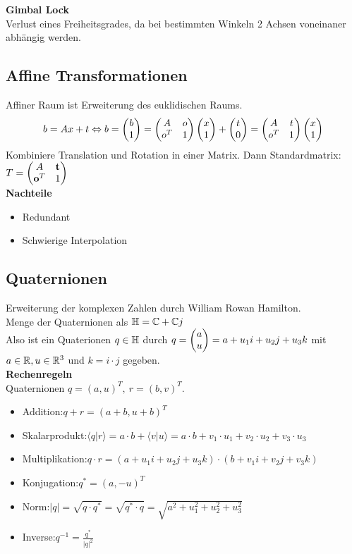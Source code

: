 \textbf{Gimbal Lock}\\
Verlust eines Freiheitsgrades, da bei bestimmten Winkeln 2 Achsen voneinaner abhängig werden.


\subsection{Affine Transformationen}%
\label{math:sub:affine-transformationen}
Affiner Raum ist Erweiterung des euklidischen Raums.
\begin{equation}
  b = Ax + t
    \Leftrightarrow
    b = \begin{pmatrix}b \\ 1\end{pmatrix} = \begin{pmatrix}A & o \\ o^T & 1\end{pmatrix} \begin{pmatrix}x \\ 1\end{pmatrix} + \begin{pmatrix}t \\ 0\end{pmatrix} =
    \begin{pmatrix}A & t \\ o^T & 1\end{pmatrix}\begin{pmatrix}x \\ 1\end{pmatrix}
\end{equation}
Kombiniere Translation und Rotation in einer Matrix. Dann Standardmatrix:
\(T = \begin{pmatrix}A & \mathbf{t} \\ \mathbf{o}^T & 1\end{pmatrix}\)\\

\textbf{Nachteile}
\begin{itemize}
\item Redundant
\item Schwierige Interpolation
\end{itemize}

\subsection{Quaternionen}%
\label{math:sub:quaternionen}
Erweiterung der komplexen Zahlen \complexnumbers{} durch William Rowan Hamilton.\\
Menge der Quaternionen \quaternionen{} als \( \mathbb{H} = \mathbb{C} + \mathbb{C} j\)\\
Also ist ein Quaterionen \(q \in \mathbb{H}\) durch \(q = \begin{pmatrix}a \\ u\end{pmatrix} = a + u_1 i + u_2 j + u_3 k\) 
mit \(a \in \mathbb{R}, u \in \mathbb{R}^3\) und \( k = i \cdot j\) gegeben.\\

\textbf{Rechenregeln}\\
Quaternionen \(q = {(a, u)}^T,\ r = {(b,v)}^T\).
\begin{itemize}
\item Addition:\@ \(q + r = {(a + b, u + b)}^T\)
\item Skalarprodukt:\@ \(\langle q \lvert r\rangle = a \cdot b + \langle v \lvert u \rangle = a \cdot b + v_1 \cdot u_1 + v_2 \cdot u_2 + v_3 \cdot u_3\)
\item Multiplikation:\@ \(q \cdot r = (a + u_1i + u_2j + u_3k) \cdot (b + v_1 i + v_2 j + v_3 k)\)
\item Konjugation:\@ \(q^* = {(a, -u)}^T\)
\item Norm:\@ \( \lvert q \lvert = \sqrt{q \cdot q^*} = \sqrt{q^* \cdot q} = \sqrt{a^2 + u_1^2 + u_2^2 + u_3^2}\)
\item Inverse:\@ \( q^{-1} = \frac{q^*}{{\lvert q \lvert}^2}\)
\end{itemize}

